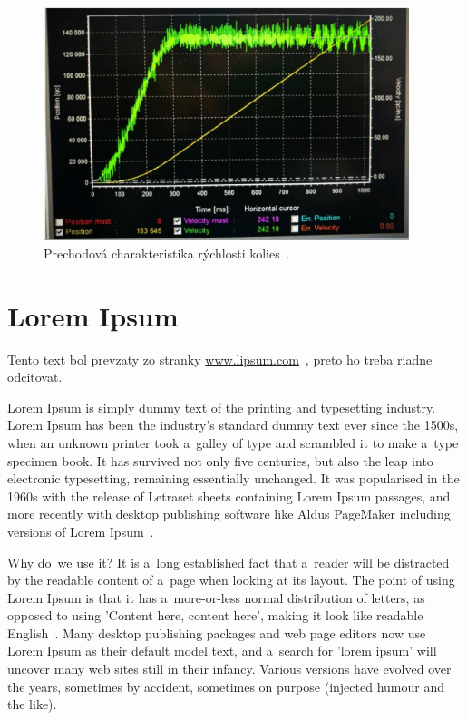 \begin{figure}[!htbp]
	\begin{center}
		\includegraphics[width=0.95\textwidth]{img/robotSpeedChar.png}
	\end{center}
	\caption{Prechodová charakteristika rýchlosti kolies~\cite{timovyProjekt}. }
	\label{fig:prechChar}
\end{figure}

\section{Lorem Ipsum}
Tento text bol prevzaty zo stranky \url{www.lipsum.com}~\cite{lipsum}, preto ho treba riadne odcitovat.

Lorem Ipsum is simply dummy text of the printing and typesetting industry. Lorem Ipsum has been the industry's standard dummy text ever since the 1500s, when an unknown printer took a~galley of type and scrambled it to make a~type specimen book. It has survived not only five centuries, but also the leap into electronic typesetting, remaining essentially unchanged. It was popularised in the 1960s with the release of Letraset sheets containing Lorem Ipsum passages, and more recently with desktop publishing software like Aldus PageMaker including versions of Lorem Ipsum~\cite{lipsum}.

Why do~we use it? It is a~long established fact that a~reader will be distracted by the readable content of a~page when looking at its layout. The point of using Lorem Ipsum is that it has a~more-or-less normal distribution of letters, as opposed to using 'Content here, content here', making it look like readable English~\cite{lipsum}. Many desktop publishing packages and web page editors now use Lorem Ipsum as their default model text, and a~search for 'lorem ipsum' will uncover many web sites still in their infancy. Various versions have evolved over the years, sometimes by accident, sometimes on purpose (injected humour and the like).

